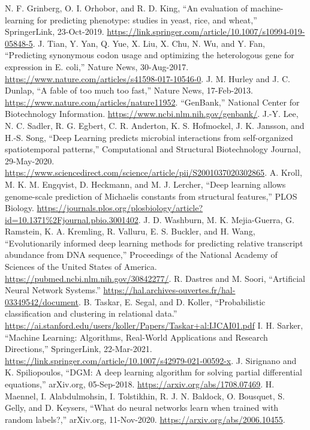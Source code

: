 \documentclass[conference]{IEEEtran}
\begin{document}
\begin{thebibliography}{00}
 N. F. Grinberg, O. I. Orhobor, and R. D. King, “An evaluation of machine-learning for predicting phenotype: studies in yeast, rice, and wheat,” SpringerLink, 23-Oct-2019. \url{https://link.springer.com/article/10.1007/s10994-019-05848-5}. 
 J. Tian, Y. Yan, Q. Yue, X. Liu, X. Chu, N. Wu, and Y. Fan, “Predicting synonymous codon usage and optimizing the heterologous gene for expression in E. coli,” Nature News, 30-Aug-2017. \url{https://www.nature.com/articles/s41598-017-10546-0}. 
 J. M. Hurley and J. C. Dunlap, “A fable of too much too fast,” Nature News, 17-Feb-2013. \url{https://www.nature.com/articles/nature11952}. 
 “GenBank,” National Center for Biotechnology Information. \url{https://www.ncbi.nlm.nih.gov/genbank/}. 
 J.-Y. Lee, N. C. Sadler, R. G. Egbert, C. R. Anderton, K. S. Hofmockel, J. K. Jansson, and H.-S. Song, “Deep Learning predicts microbial interactions from self-organized spatiotemporal patterns,” Computational and Structural Biotechnology Journal, 29-May-2020. \url{https://www.sciencedirect.com/science/article/pii/S2001037020302865}. 
 A. Kroll, M. K. M. Engqvist, D. Heckmann, and M. J. Lercher, “Deep learning allows genome-scale prediction of Michaelis constants from structural features,” PLOS Biology. \url{https://journals.plos.org/plosbiology/article?id=10.1371\%2Fjournal.pbio.3001402}. 
 J. D. Washburn, M. K. Mejia-Guerra, G. Ramstein, K. A. Kremling, R. Valluru, E. S. Buckler, and H. Wang, “Evolutionarily informed deep learning methods for predicting relative transcript abundance from DNA sequence,” Proceedings of the National Academy of Sciences of the United States of America. \url{https://pubmed.ncbi.nlm.nih.gov/30842277/}. 
 R. Dastres and M. Soori, “Artificial Neural Network Systems.” \url{https://hal.archives-ouvertes.fr/hal-03349542/document}. 
 B. Taskar, E. Segal, and D. Koller, “Probabilistic classiﬁcation and clustering in relational data.” \url{https://ai.stanford.edu/users/koller/Papers/Taskar+al:IJCAI01.pdf} 
 I. H. Sarker, “Machine Learning: Algorithms, Real-World Applications and Research Directions,” SpringerLink, 22-Mar-2021. \url{https://link.springer.com/article/10.1007/s42979-021-00592-x}. 
 J. Sirignano and K. Spiliopoulos, “DGM: A deep learning algorithm for solving partial differential equations,” arXiv.org, 05-Sep-2018. \url{https://arxiv.org/abs/1708.07469}. 
 H. Maennel, I. Alabdulmohsin, I. Tolstikhin, R. J. N. Baldock, O. Bousquet, S. Gelly, and D. Keysers, “What do neural networks learn when trained with random labels?,” arXiv.org, 11-Nov-2020. \url{https://arxiv.org/abs/2006.10455}. 

\end{thebibliography}
\end{document}
